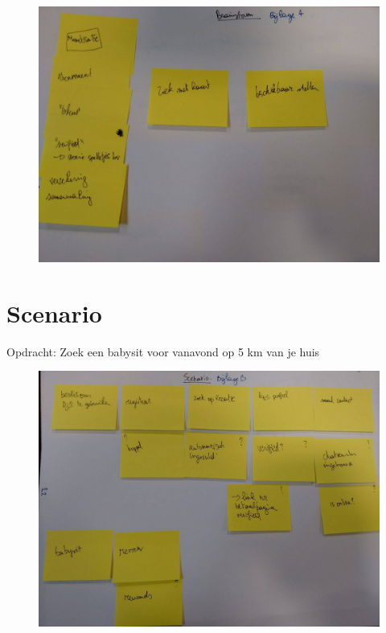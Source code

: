 \documentclass[a4paper,12pt]{article}
\begin{document}
\begin{figure}[H]
  \centering
  \includegraphics[width=\textwidth,keepaspectratio]{./brainstorm.jpg}
\end{figure}

\section{Scenario}

Opdracht: Zoek een babysit voor vanavond op 5 km van je huis

\begin{figure}[H]
  \centering
  \includegraphics[width=\textwidth,keepaspectratio]{./scenario.jpg}
\end{figure}
\end{document}
